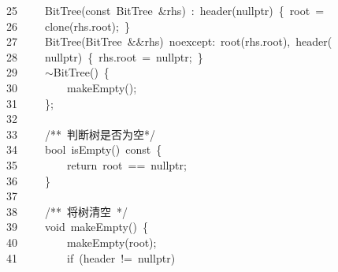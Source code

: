 \documentclass[11pt,a4paper]{ctexart}
\newcommand{\hlstd}[1]{\textcolor[rgb]{0.2,0.2,0.2}{#1}}
\newcommand{\hlcom}[1]{\textcolor[rgb]{0.59,0.59,0.59}{#1}}
\newcommand{\hlopt}[1]{\textcolor[rgb]{0.2,0.2,0.2}{#1}}
\newcommand{\hllin}[1]{\textcolor[rgb]{0.59,0.59,0.59}{#1}}
\newcommand{\hlkwa}[1]{\textcolor[rgb]{0.23,0.42,0.78}{#1}}
\newcommand{\hlkwb}[1]{\textcolor[rgb]{0.63,0,0.31}{#1}}
\newcommand{\hlkwc}[1]{\textcolor[rgb]{0,0.63,0.31}{#1}}
\newcommand{\hlkwd}[1]{\textcolor[rgb]{0.78,0.23,0.41}{#1}}
\begin{document}
\hllin{25\ }\hlstd{}\hlstd{\ \ \ \ }\hlstd{}\hlkwd{BitTree}\hlstd{}\hlopt{(}\hlstd{}\hlkwb{const\ }\hlstd{BitTree\ }\hlopt{\&}\hlstd{rhs}\hlopt{)\ :\ }\hlstd{}\hlkwd{header}\hlstd{}\hlopt{(}\hlstd{}\hlkwc{nullptr}\hlstd{}\hlopt{)\ \{\ }\hlstd{root\ }\hlopt{=\ }\Righttorque\\
\hllin{26\ }\hlstd{}\hlstd{\ \ \ \ }\hlstd{}\hlkwd{clone}\hlstd{}\hlopt{(}\hlstd{rhs}\hlopt{.}\hlstd{root}\hlopt{);\ \}}\\
\hllin{27\ }\hlstd{}\hlstd{\ \ \ \ }\hlstd{}\hlkwd{BitTree}\hlstd{}\hlopt{(}\hlstd{BitTree\ }\hlopt{\&\&}\hlstd{rhs}\hlopt{)\ }\hlstd{noexcept}\hlopt{:\ }\hlstd{}\hlkwd{root}\hlstd{}\hlopt{(}\hlstd{rhs}\hlopt{.}\hlstd{root}\hlopt{),\ }\hlstd{}\hlkwd{header}\hlstd{}\hlopt{(}\Righttorque\\
\hllin{28\ }\hlstd{}\hlstd{\ \ \ \ }\hlstd{}\hlkwc{nullptr}\hlstd{}\hlopt{)\ \{\ }\hlstd{rhs}\hlopt{.}\hlstd{root\ }\hlopt{=\ }\hlstd{}\hlkwc{nullptr}\hlstd{}\hlopt{;\ \}}\\
\hllin{29\ }\hlstd{}\hlstd{\ \ \ \ }\hlstd{}\hlopt{$\sim$}\hlstd{}\hlkwd{BitTree}\hlstd{}\hlopt{()\ \{}\\
\hllin{30\ }\hlstd{}\hlstd{\ \ \ \ \ \ \ \ }\hlstd{}\hlkwd{makeEmpty}\hlstd{}\hlopt{();}\\
\hllin{31\ }\hlstd{}\hlstd{\ \ \ \ }\hlstd{}\hlopt{\};}\\
\hllin{32\ }\hlstd{}\\
\hllin{33\ }\hlstd{}\hlstd{\ \ \ \ }\hlstd{}\hlcom{/{*}{*}\ 判断树是否为空{*}/}\hlstd{}\\
\hllin{34\ }\hlstd{}\hlstd{\ \ \ \ }\hlstd{}\hlkwb{bool\ }\hlstd{}\hlkwd{isEmpty}\hlstd{}\hlopt{()\ }\hlstd{}\hlkwb{const\ }\hlstd{}\hlopt{\{}\\
\hllin{35\ }\hlstd{}\hlstd{\ \ \ \ \ \ \ \ }\hlstd{}\hlkwa{return\ }\hlstd{root\ }\hlopt{==\ }\hlstd{}\hlkwc{nullptr}\hlstd{}\hlopt{;}\\
\hllin{36\ }\hlstd{}\hlstd{\ \ \ \ }\hlstd{}\hlopt{\}}\\
\hllin{37\ }\hlstd{}\\
\hllin{38\ }\hlstd{}\hlstd{\ \ \ \ }\hlstd{}\hlcom{/{*}{*}\ 将树清空\ {*}/}\hlstd{}\\
\hllin{39\ }\hlstd{}\hlstd{\ \ \ \ }\hlstd{}\hlkwb{void\ }\hlstd{}\hlkwd{makeEmpty}\hlstd{}\hlopt{()\ \{}\\
\hllin{40\ }\hlstd{}\hlstd{\ \ \ \ \ \ \ \ }\hlstd{}\hlkwd{makeEmpty}\hlstd{}\hlopt{(}\hlstd{root}\hlopt{);}\\
\hllin{41\ }\hlstd{}\hlstd{\ \ \ \ \ \ \ \ }\hlstd{}\hlkwa{if\ }\hlstd{}\hlopt{(}\hlstd{header\ }\hlopt{!=\ }\hlstd{}\hlkwc{nullptr}\hlstd{}\hlopt{)}\\
\end{document}
